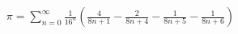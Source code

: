 \documentclass[preview]{standalone}
\begin{document}
\begin{align*}
\pi = \sum_{n=0}^{\infty} \frac{1}{16^n} \left( \frac{4}{8n+1} - \frac{2}{8n+4} - \frac{1}{8n+5} - \frac{1}{8n+6} \right)
\end{align*}
\end{document}
